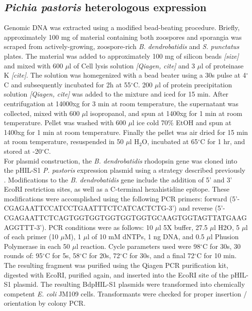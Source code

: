 \subsection*{\textit{Pichia pastoris} heterologous expression}
Genomic DNA was extracted using a modified bead-beating procedure. Briefly, approximately 100 mg of material containing both zoospores and sporangia was scraped from actively-growing, zoospore-rich \textit{B. dendrobatidis} and \textit{S. punctatus} plates. The material was added to approximately 100 mg of silicon beads \emph{[size]} and mixed with 600 $\mu$l of Cell lysis solution \emph{[Qiagen, cite]} and 3 $\mu$l of proteinase K \emph{[cite]}. The solution was homegenized with a bead beater using a 30s pulse at 4$^{\circ}$C and subsequently incubated for 2h at 55$^{\circ}$C. 200 $\mu$l of protein precipitation solution \emph{[Qiagen, cite]} was added to the mixture and iced for 15 min. After centrifugation at 14000xg for 3 min at room temperature, the supernatant was collected, mixed with 600 $\mu$l isopropanol, and spun at 1400xg for 1 min at room temperature. Pellet was washed with 600 $\mu$l ice cold 70\% EtOH and spun at 1400xg for 1 min at room temperature. Finally the pellet was air dried for 15 min at room temperature, resuspended in 50 $\mu$l H$_{2}$O, incubated at 65$^{\circ}$C for 1 hr, and stored at -20$^{\circ}$C.\\
\indent For plasmid construction, the \textit{B. dendrobatidis} rhodopsin gene was cloned into the pHIL-S1 \textit{P. pastoris} expression plasmid using a strategy described previously \cite{Bieszke1999}.  Modifications to the \textit{B. dendrobatidis} gene include the addition of 5' and 3' EcoRI restriction sites, as well as a C-terminal hexahistidine epitope. These modifications were accomplished using the following PCR primers: forward (5'-CGAGAATTCCATCCTGAATTTCTCATCACTCTG-3') and reverse (5'-CGAGAATTCTCAGTGGTGGTGGTGGTGGTGCAAGTGGTAGTTATGAAGAGGTTT-3'). PCR conditions were as follows: 10 $\mu$l 5X buffer, 27.5 $\mu$l H2O, 5 $\mu$l of each primer (10 $\mu$M), 1 $\mu$l of 10 mM dNTPs, 1 ng DNA, and 0.5 $\mu$l Phusion Polymerase in each 50 $\mu$l reaction. Cycle parameters used were 98$^{\circ}$C for 30s, 30 rounds of: 95$^{\circ}$C for 5s, 58$^{\circ}$C for 20s, 72$^{\circ}$C for 30s, and a final 72$^{\circ}$C for 10 min. The resulting fragment was purified using the Qiagen PCR purification kit, digested with EcoRI, purified again, and inserted into the EcoRI site of the pHIL-S1 plasmid. The resulting BdpHIL-S1 plasmids were transformed into chemically competent \textit{E. coli} JM109 cells. Transformants were checked for proper insertion / orientation by colony PCR.\\ 

